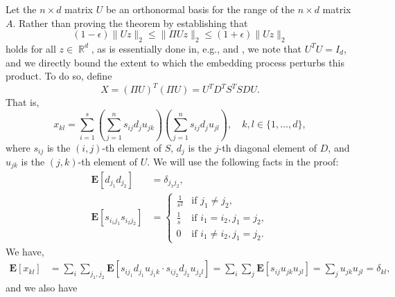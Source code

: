 \documentclass[11pt]{article}
\DeclareMathOperator{\R}{\mathbb{R}}
\begin{document}
Let the $n \times d$ matrix $U$ be an orthonormal basis for the range of the $n
\times d$ matrix $A$. 
Rather than proving the theorem by establishing that
$$
(1-\epsilon) \|U z\|_2 \leq \| \Pi U z \|_2 \leq (1+\epsilon) \|U z\|_2
$$ 
holds for all $z \in \R^d$, as is essentially done in, e.g., \cite{DMM06} and
\cite{CW12sparse_TR}, we note that $U^TU=I_d$, and we directly bound the extent
to which the embedding process perturbs this product.
To do so, define
\begin{equation*}
  X = (\Pi U)^T (\Pi U) = U^T D^T S^T S D U.
\end{equation*}
That is,
\begin{equation*}
  x_{kl} = \sum_{i=1}^s \left(\sum_{j=1}^n s_{ij} d_j u_{jk}\right)\left(\sum_{j=1}^n s_{ij} d_j u_{jl} \right), \quad k, l \in \{ 1, \ldots, d \},
\end{equation*}
where $s_{ij}$ is the $(i,j)$-th element of $S$, $d_j$ is the $j$-th diagonal
element of $D$, and $u_{jk}$ is the $(j,k)$-th element of $U$.
We will use the following facts in the proof:
\begin{align*}
  \mathbf{E}[d_{j_1} d_{j_2}] &= \delta_{j_1j_2},\\
  \mathbf{E}[s_{i_1 j_1} s_{i_2 j_2}] &=
  \begin{cases}
    \frac{1}{s^2} & \text{if } j_1 \neq j_2, \\
    \frac{1}{s} & \text{if } i_1 = i_2, j_1 = j_2, \\
    0 & \text{if } i_1 \neq i_2, j_1 = j_2.
  \end{cases}
\end{align*}
We have,
\begin{align*}
  \mathbf{E}[x_{kl}] &= \sum_{i} \sum_{j_1, j_2} \mathbf{E}[ s_{ij_1} d_{j_1}
  u_{j_1k} \cdot s_{ij_2} d_{j_2} u_{j_2l} ] = \sum_{i} \sum_{j} \mathbf{E}[
  s_{ij} u_{jk} u_{jl}] = \sum_{j} u_{jk} u_{jl} = \delta_{kl},
\end{align*}
and we also have
\end{document}
